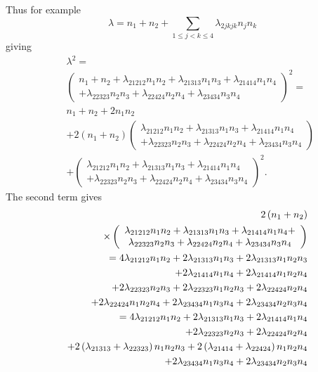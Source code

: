 \documentclass[12pt]{article}
\begin{document}
Thus for example 
\begin{equation*}
\lambda =n_{1}+n_{2}+\sum_{1\leq j<k\leq 4}\lambda _{2jkjk}n_{j}n_{k}
\end{equation*}%
giving%
\begin{eqnarray*}
&&\lambda ^{2}= \\
&&\left( 
\begin{array}{c}
n_{1}+n_{2}+\lambda _{21212}n_{1}n_{2}+\lambda _{21313}n_{1}n_{3}+\lambda
_{21414}n_{1}n_{4} \\ 
+\lambda _{22323}n_{2}n_{3}+\lambda _{22424}n_{2}n_{4}+\lambda
_{23434}n_{3}n_{4}%
\end{array}%
\right) ^{2}= \\
&&n_{1}+n_{2}+2n_{1}n_{2} \\
&&+2\left( n_{1}+n_{2}\right) \left( 
\begin{array}{c}
\lambda _{21212}n_{1}n_{2}+\lambda _{21313}n_{1}n_{3}+\lambda
_{21414}n_{1}n_{4} \\ 
+\lambda _{22323}n_{2}n_{3}+\lambda _{22424}n_{2}n_{4}+\lambda
_{23434}n_{3}n_{4}%
\end{array}%
\right) \\
&&+\left( 
\begin{array}{c}
\lambda _{21212}n_{1}n_{2}+\lambda _{21313}n_{1}n_{3}+\lambda
_{21414}n_{1}n_{4} \\ 
+\lambda _{22323}n_{2}n_{3}+\lambda _{22424}n_{2}n_{4}+\lambda
_{23434}n_{3}n_{4}%
\end{array}%
\right) ^{2}.
\end{eqnarray*}%
The second term gives%
\begin{eqnarray}
&&2\left( n_{1}+n_{2}\right)  \notag \\
&&\times \left( 
\begin{array}{c}
\lambda _{21212}n_{1}n_{2}+\lambda _{21313}n_{1}n_{3}+\lambda
_{21414}n_{1}n_{4}+ \\ 
\lambda _{22323}n_{2}n_{3}+\lambda _{22424}n_{2}n_{4}+\lambda
_{23434}n_{3}n_{4}%
\end{array}%
\right)  \notag \\
&&\left. =\right. 4\lambda _{21212}n_{1}n_{2}+2\lambda
_{21313}n_{1}n_{3}+2\lambda _{21313}n_{1}n_{2}n_{3}  \notag \\
&&+2\lambda _{21414}n_{1}n_{4}+2\lambda _{21414}n_{1}n_{2}n_{4}  \notag \\
&&+2\lambda _{22323}n_{2}n_{3}+2\lambda _{22323}n_{1}n_{2}n_{3}+2\lambda
_{22424}n_{2}n_{4}  \notag \\
&&+2\lambda _{22424}n_{1}n_{2}n_{4}+2\lambda
_{23434}n_{1}n_{3}n_{4}+2\lambda _{23434}n_{2}n_{3}n_{4}  \notag \\
&&\left. =\right. 4\lambda _{21212}n_{1}n_{2}+2\lambda
_{21313}n_{1}n_{3}+2\lambda _{21414}n_{1}n_{4}  \notag \\
&&+2\lambda _{22323}n_{2}n_{3}+2\lambda _{22424}n_{2}n_{4}  \notag \\
&&+2\left( \lambda _{21313}+\lambda _{22323}\right) n_{1}n_{2}n_{3}+2\left(
\lambda _{21414}+\lambda _{22424}\right) n_{1}n_{2}n_{4}  \notag \\
&&+2\lambda _{23434}n_{1}n_{3}n_{4}+2\lambda _{23434}n_{2}n_{3}n_{4}
\end{eqnarray}%
\end{document}

